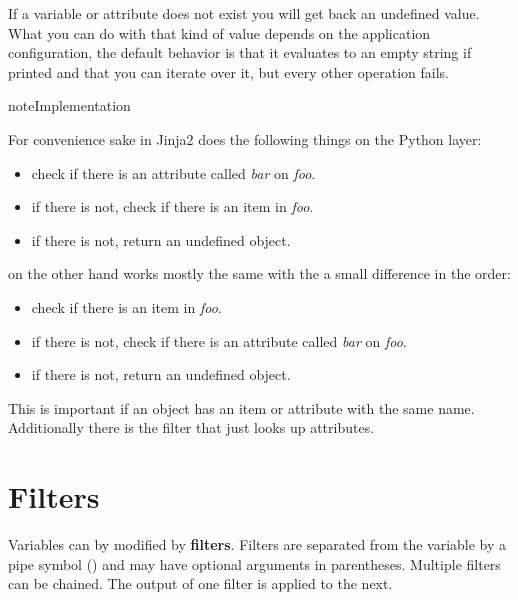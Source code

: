 \documentclass[a4paper,10pt,english]{sphinxmanual}
\begin{document}
If a variable or attribute does not exist you will get back an undefined
value.  What you can do with that kind of value depends on the application
configuration, the default behavior is that it evaluates to an empty string
if printed and that you can iterate over it, but every other operation fails.
\label{templates:notes-on-subscriptions}
\begin{notice}{note}{Implementation}

For convenience sake  in Jinja2 does the following things on
the Python layer:
\begin{itemize}
\item {} 
check if there is an attribute called \emph{bar} on \emph{foo}.

\item {} 
if there is not, check if there is an item  in \emph{foo}.

\item {} 
if there is not, return an undefined object.

\end{itemize}

 on the other hand works mostly the same with the a small
difference in the order:
\begin{itemize}
\item {} 
check if there is an item  in \emph{foo}.

\item {} 
if there is not, check if there is an attribute called \emph{bar} on \emph{foo}.

\item {} 
if there is not, return an undefined object.

\end{itemize}

This is important if an object has an item or attribute with the same
name.  Additionally there is the {\hyperref[templates:attr]{}} filter that just looks up
attributes.
\end{notice}


\section{Filters}
\label{templates:id2}\label{templates:filters}
Variables can by modified by \textbf{filters}.  Filters are separated from the
variable by a pipe symbol (\code{\textbar{}}) and may have optional arguments in
parentheses.  Multiple filters can be chained.  The output of one filter is
applied to the next.
\end{document}
